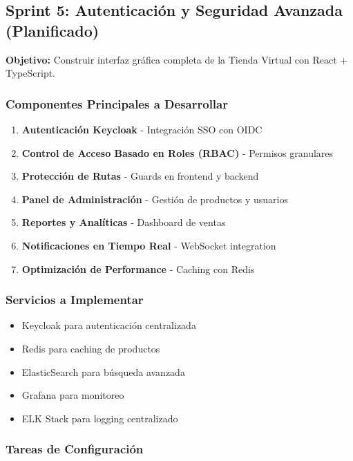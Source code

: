 \documentclass[12pt,a4paper]{article}
\begin{document}
\subsection{Sprint 5: Autenticación y Seguridad Avanzada (Planificado)}

\textbf{Objetivo:} Construir interfaz gráfica completa de la Tienda Virtual con React + TypeScript.

\subsubsection{Componentes Principales a Desarrollar}

\begin{enumerate}
    \item \textbf{Autenticación Keycloak} - Integración SSO con OIDC
    \item \textbf{Control de Acceso Basado en Roles (RBAC)} - Permisos granulares
    \item \textbf{Protección de Rutas} - Guards en frontend y backend
    \item \textbf{Panel de Administración} - Gestión de productos y usuarios
    \item \textbf{Reportes y Analíticas} - Dashboard de ventas
    \item \textbf{Notificaciones en Tiempo Real} - WebSocket integration
    \item \textbf{Optimización de Performance} - Caching con Redis
\end{enumerate}

\subsubsection{Servicios a Implementar}

\begin{itemize}
    \item Keycloak para autenticación centralizada
    \item Redis para caching de productos
    \item ElasticSearch para búsqueda avanzada
    \item Grafana para monitoreo
    \item ELK Stack para logging centralizado
\end{itemize}

\subsubsection{Tareas de Configuración}
\end{document}
